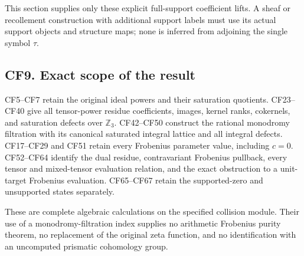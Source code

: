 \documentclass[
  10pt,
]{article}
\begin{document}
This section supplies only these explicit full-support coefficient
lifts. A sheaf or recollement construction with additional support
labels must use its actual support objects and structure maps; none is
inferred from adjoining the single symbol \(\tau\).

\subsection{CF9. Exact scope of the
result}\label{cf9.-exact-scope-of-the-result}

CF5--CF7 retain the original ideal powers and their saturation
quotients. CF23--CF40 give all tensor-power residue coefficients,
images, kernel ranks, cokernels, and saturation defects over
\(\mathbb Z_3\). CF42--CF50 construct the rational monodromy filtration
with its canonical saturated integral lattice and all integral defects.
CF17--CF29 and CF51 retain every Frobenius parameter value, including
\(c=0\). CF52--CF64 identify the dual residue, contravariant Frobenius
pullback, every tensor and mixed-tensor evaluation relation, and the
exact obstruction to a unit-target Frobenius evaluation. CF65--CF67
retain the supported-zero and unsupported states separately.

These are complete algebraic calculations on the specified collision
module. Their use of a monodromy-filtration index supplies no arithmetic
Frobenius purity theorem, no replacement of the original zeta function,
and no identification with an uncomputed prismatic cohomology group.
\end{document}
